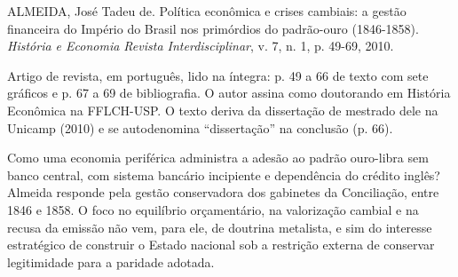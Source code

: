 
\begin{identificacao}
ALMEIDA, José Tadeu de. Política econômica e crises cambiais: a gestão
financeira do Império do Brasil nos primórdios do padrão-ouro (1846-1858).
\textit{História e Economia Revista Interdisciplinar}, v. 7, n. 1, p. 49-69,
2010.

Artigo de revista, em português, lido na íntegra: p. 49 a 66 de texto com sete
gráficos e p. 67 a 69 de bibliografia. O autor assina como doutorando em
História Econômica na FFLCH-USP. O texto deriva da dissertação de mestrado dele
na Unicamp (2010) e se autodenomina ``dissertação'' na conclusão (p. 66).
\end{identificacao}


Como uma economia periférica administra a adesão ao padrão ouro-libra sem banco
central, com sistema bancário incipiente e dependência do crédito inglês?
Almeida responde pela gestão conservadora dos gabinetes da Conciliação, entre
1846 e 1858. O foco no equilíbrio orçamentário, na valorização cambial e na
recusa da emissão não vem, para ele, de doutrina metalista, e sim do interesse
estratégico de construir o Estado nacional sob a restrição externa de conservar
legitimidade para a paridade adotada.


